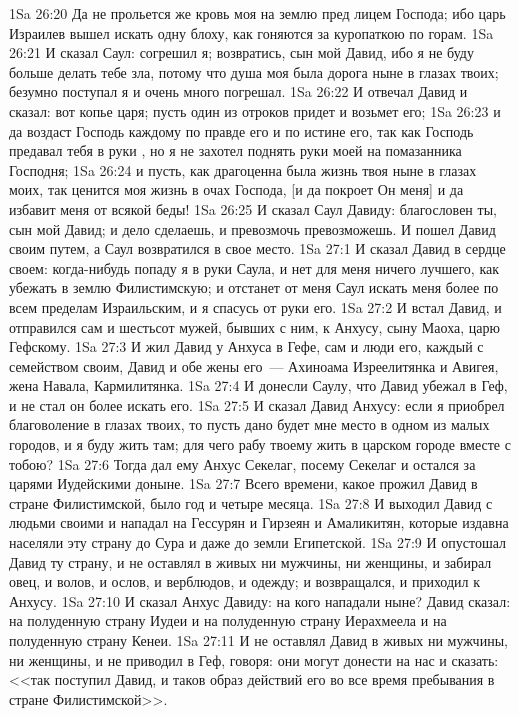 \vs 1Sa 26:20 Да не прольется же кровь моя на землю пред лицем Господа; ибо царь Израилев вышел искать одну блоху, как гоняются за куропаткою по горам.
\vs 1Sa 26:21 И сказал Саул: согрешил я; возвратись, сын мой Давид, ибо я не буду больше делать тебе зла, потому что душа моя была дорога ныне в глазах твоих; безумно поступал я и очень много погрешал.
\vs 1Sa 26:22 И отвечал Давид и сказал: вот копье царя; пусть один из отроков придет и возьмет его;
\vs 1Sa 26:23 и да воздаст Господь каждому по правде его и по истине его, так как Господь предавал тебя в руки , но я не захотел поднять руки моей на помазанника Господня;
\vs 1Sa 26:24 и пусть, как драгоценна была жизнь твоя ныне в глазах моих, так ценится моя жизнь в очах Господа, [и да покроет Он меня] и да избавит меня от всякой беды!
\vs 1Sa 26:25 И сказал Саул Давиду: благословен ты, сын мой Давид; и дело сделаешь, и превозмочь превозможешь. И пошел Давид своим путем, а Саул возвратился в свое место.
\vs 1Sa 27:1 И сказал Давид в сердце своем: когда-нибудь попаду я в руки Саула, и нет для меня ничего лучшего, как убежать в землю Филистимскую; и отстанет от меня Саул  искать меня более по всем пределам Израильским, и я спасусь от руки его.
\vs 1Sa 27:2 И встал Давид, и отправился сам и шестьсот мужей, бывших с ним, к Анхусу, сыну Маоха, царю Гефскому.
\vs 1Sa 27:3 И жил Давид у Анхуса в Гефе, сам и люди его, каждый с семейством своим, Давид и обе жены его~--- Ахиноама Изреелитянка и Авигея,  жена Навала, Кармилитянка.
\vs 1Sa 27:4 И донесли Саулу, что Давид убежал в Геф, и не стал он более искать его.
\vs 1Sa 27:5 И сказал Давид Анхусу: если я приобрел благоволение в глазах твоих, то пусть дано будет мне место в одном из малых городов, и я буду жить там; для чего рабу твоему жить в царском городе вместе с тобою?
\vs 1Sa 27:6 Тогда дал ему Анхус Секелаг, посему Секелаг и остался за царями Иудейскими доныне.
\vs 1Sa 27:7 Всего времени, какое прожил Давид в стране Филистимской, было год и четыре месяца.
\vs 1Sa 27:8 И выходил Давид с людьми своими и нападал на Гессурян и Гирзеян и Амаликитян, которые издавна населяли эту страну до Сура и даже до земли Египетской.
\vs 1Sa 27:9 И опустошал Давид ту страну, и не оставлял в живых ни мужчины, ни женщины, и забирал овец, и волов, и ослов, и верблюдов, и одежду; и возвращался, и приходил к Анхусу.
\vs 1Sa 27:10 И сказал Анхус Давиду: на кого нападали ныне? Давид сказал: на полуденную страну Иудеи и на полуденную страну Иерахмеела и на полуденную страну Кенеи.
\vs 1Sa 27:11 И не оставлял Давид в живых ни мужчины, ни женщины, и не приводил в Геф, говоря: они могут донести на нас и сказать: <<так поступил Давид, и таков образ действий его во все время пребывания в стране Филистимской>>.
